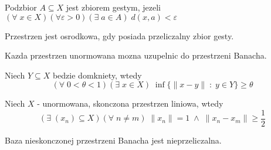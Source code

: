 \begin{multicols}{2}
    \bigskip

    \pdef

    Podzbior $A\subseteq X$ jest zbiorem {\color{def}gestym}, jezeli\\
    $(\forall\;x\in X)(\forall\varepsilon>0)(\exists\;a\in A)\;d(x,a)<\varepsilon$
    \medskip

    Przestrzen jest {\color{def}osrodkowa}, gdy posiada przeliczalny zbior gesty.


    \kdef

    Kazda przestrzen unormowana mozna uzupelnic do przestrzeni Banacha.
    \medskip

    Niech $Y\subseteq X$ bedzie domkniety, wtedy
    $$(\forall\;0<\theta<1)(\exists\;x\in X)\;\inf\{\|x-y\|\;:\;y\in Y\}\geq\theta$$

    Niech $X$ - unormowana, skonczona przestrzen liniowa, wtedy
    $$(\exists\;(x_n)\subseteq X)(\forall\;n\neq m)\;\|x_n\|=1\;\land\;\|x_n-x_m\|\geq \frac12$$

    Baza nieskonczonej przestrzeni Banacha jest nieprzeliczalna.

\end{multicols}